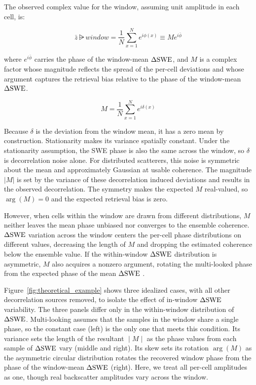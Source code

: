 \documentclass[journal abbreviation, manuscript]{copernicus}
\begin{document}
\noindent The observed complex value for the window, assuming unit amplitude in each cell, is:

\begin{equation}\label{eq:z_window}
    \bar{z}\rsub{window}
      = \frac{1}{N} \sum_{x=1}^{N} e^{i\phi(x)}
      \equiv M e^{i\bar{\phi}}
\end{equation}

\noindent where $e^{i\bar{\phi}}$ carries the phase of the window-mean $\Delta\mathrm{SWE}$, and $M$ is a complex factor whose magnitude reflects the spread of the per-cell deviations and whose argument captures the retrieval bias relative to the phase of the window-mean $\Delta\mathrm{SWE}$.

\begin{equation}\label{eq:def_m}
    M = \frac{1}{N} \sum_{x=1}^{N} e^{i\delta(x)}
\end{equation}

Because $\delta$ is the deviation from the window mean, it has a zero mean by construction. Stationarity makes its variance spatially constant. Under the stationarity assumption, the SWE phase is also the same across the window, so $\delta$ is decorrelation noise alone. For distributed scatterers, this noise is symmetric about the mean and approximately Gaussian at usable coherence. The magnitude $|M|$ is set by the variance of these decorrelation induced deviations and results in the observed decorrelation. The symmetry makes the expected $M$ real-valued, so $\arg(M)=0$ and the expected retrieval bias is zero.

However, when cells within the window are drawn from different distributions, $M$ neither leaves the mean phase unbiased nor converges to the ensemble coherence. $\Delta\mathrm{SWE}$ variation across the window centers the per-cell phase distributions on different values, decreasing the length of $M$ and dropping the estimated coherence below the ensemble value. If the within-window $\Delta\mathrm{SWE}$ distribution is asymmetric, $M$ also acquires a nonzero argument, rotating the multi-looked phase from the expected phase of the mean $\Delta\mathrm{SWE}$ \citep{fischer1993}.

Figure~\ref{fig:theoretical_example} shows three idealized cases, with all other decorrelation sources removed, to isolate the effect of in-window $\Delta\mathrm{SWE}$ variability. The three panels differ only in the within-window distribution of $\Delta\mathrm{SWE}$. Multi-looking assumes that the samples in the window share a single phase, so the constant case (left) is the only one that meets this condition. Its variance sets the length of the resultant $∣M∣$ as the phase values from each sample of $\Delta\mathrm{SWE}$ vary (middle and right). Its skew sets its rotation $\arg(M)$ as the asymmetric circular distribution rotates the recovered window phase from the phase of the window-mean $\Delta\mathrm{SWE}$ (right). Here, we treat all per-cell amplitudes as one, though real backscatter amplitudes vary across the window.
\end{document}
